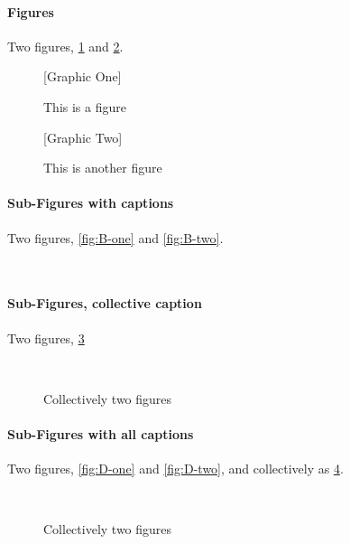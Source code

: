 \documentclass{article}
\begin{document}
\paragraph{Figures}
Two figures, \ref{fig:A-one} and \ref{fig:A-two}.

\begin{figure}[ht]
\begin{center}
 [Graphic One]\\
\caption{This is a figure\label{fig:A-one}}
\end{center}
\end{figure}

\begin{figure}[ht]
\begin{center}
[Graphic Two]\\
\caption{This is another figure\label{fig:A-two}}
\end{center}
\end{figure}

\paragraph{Sub-Figures with captions}
Two figures, \ref{fig:B-one} and \ref{fig:B-two}.

\begin{figure}[ht]
\begin{center}
\\
\end{center}
\end{figure}

\paragraph{Sub-Figures, collective caption}
Two figures, \ref{fig:C}

\begin{figure}[ht]
\begin{center}
\\
\end{center}
\caption{Collectively two figures\label{fig:C}}
\end{figure}

\paragraph{Sub-Figures with all captions}
Two figures, \ref{fig:D-one} and \ref{fig:D-two},
and collectively as \ref{fig:D}.

\begin{figure}[ht]
\begin{center}
\\
\caption{Collectively two figures\label{fig:D}}
\end{center}
\end{figure}
\end{document}
